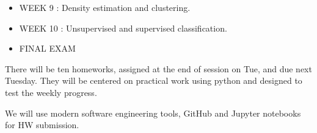 \documentclass[10pt]{article}
\begin{document}
\begin{itemize}
\item WEEK  9 :  Density estimation and clustering.







\item WEEK  10 :  Unsupervised and supervised classification.





\item FINAL EXAM 

\end{itemize}


\vskip 0.2in


There will be ten homeworks, assigned at the end of session on Tue, and due next Tuesday. They will
be centered on practical work using python and designed to test the weekly progress. 

We will use modern software engineering tools, GitHub and Jupyter notebooks for HW submission. 
\end{document}
